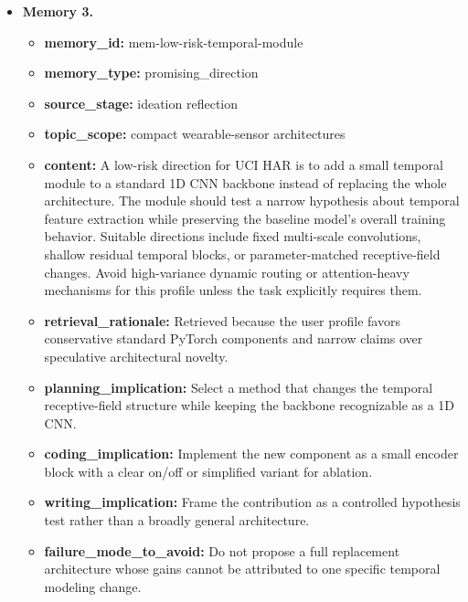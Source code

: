 \documentclass{opendatalab}
\begin{document}
\begin{tcolorbox}
\begin{itemize}
  \item \textbf{Memory 3.}
  \begin{itemize}\setlength\itemsep{1pt}
    \item \textbf{memory\_id:} mem-low-risk-temporal-module
    \item \textbf{memory\_type:} promising\_direction
    \item \textbf{source\_stage:} ideation reflection
    \item \textbf{topic\_scope:} compact wearable-sensor architectures
    \item \textbf{content:} A low-risk direction for UCI HAR is to add a small temporal module to a standard 1D CNN backbone instead of replacing the whole architecture. The module should test a narrow hypothesis about temporal feature extraction while preserving the baseline model's overall training behavior. Suitable directions include fixed multi-scale convolutions, shallow residual temporal blocks, or parameter-matched receptive-field changes. Avoid high-variance dynamic routing or attention-heavy mechanisms for this profile unless the task explicitly requires them.
    \item \textbf{retrieval\_rationale:} Retrieved because the user profile favors conservative standard PyTorch components and narrow claims over speculative architectural novelty.
    \item \textbf{planning\_implication:} Select a method that changes the temporal receptive-field structure while keeping the backbone recognizable as a 1D CNN.
    \item \textbf{coding\_implication:} Implement the new component as a small encoder block with a clear on/off or simplified variant for ablation.
    \item \textbf{writing\_implication:} Frame the contribution as a controlled hypothesis test rather than a broadly general architecture.
    \item \textbf{failure\_mode\_to\_avoid:} Do not propose a full replacement architecture whose gains cannot be attributed to one specific temporal modeling change.
  \end{itemize}
\end{itemize}


\end{tcolorbox}
\end{document}
